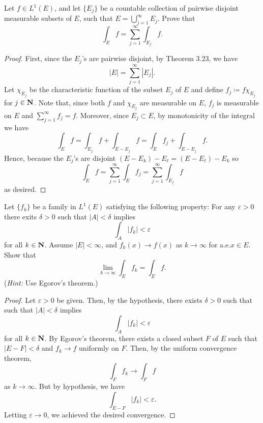 \begin{problem}
Let $f\in L^1(E)$, and let $\{E_j\}$ be a countable collection of pairwise
disjoint measurable subsets of $E$, such that $E=\bigcup_{j=1}^\infty
E_j$. Prove that
\[
\int_E f=\sum_{j=1}^\infty\int_{E_j}f.
\]
\end{problem}
\begin{proof}
First, since the $E_j$'s are pairwise disjoint, by Theorem 3.23, we have
\begin{equation}
\label{eq:disjoint-measure-2-2}
|E|=\sum_{j=1}^\infty|E_j|.
\end{equation}
Let $\chi_{E_j}$ be the characteristic function of the subset $E_j$ of
$E$ and define $f_j\coloneqq f\chi_{E_j}$ for $j\in\mathbf{N}$. Note that, since
both $f$ and $\chi_{E_j}$ are measurable on $E$, $f_j$ is
measurable on $E$ and $\sum_{j=1}^\infty f_j=f$. Moreover, since
$E_j\subset E$, by monotonicity of the integral we have
\begin{equation}
\label{eq:monotonicity-2-2}
\int_{E} f=
\int_{E_j} f+\int_{E\minus E_j}f=
\int_E f_j+\int_{E\minus E_j}f.
\end{equation}
Hence, because the $E_j$'s are disjoint $(E\minus E_k)\minus
E_\ell=(E\minus E_\ell)\minus E_k$ so
\begin{equation}
\label{eq:desired-sum-2}
\int_E f=\sum_{j=1}^\infty\int_E f_j=\sum_{j=1}^\infty\int_{E_j}f
\end{equation}
as desired.
\end{proof}

\begin{problem}
Let $\{f_k\}$ be a family in $L^1(E)$ satisfying the following property:
For any $\varepsilon>0$ there exits $\delta>0$ such that $|A|<\delta$
implies
\[
\int_A |f_k|<\varepsilon
\]
for all $k\in\mathbf{N}$. Assume $|E|<\infty$, and $f_k(x)\to f(x)$ as
$k\to\infty$ for a.e.\@ $x\in E$. Show that
\[
\lim_{k\to\infty}\int_E f_k=\int_E f.
\]
(\emph{Hint:} Use Egorov's theorem.)
\end{problem}
\begin{proof}
Let $\varepsilon>0$ be given. Then, by the hypothesis, there exists
$\delta>0$ such that
such that $|A|<\delta$
implies
\begin{equation}
  \label{eq:hypothesis-2-3}
\int_A |f_k|<\varepsilon
\end{equation}
for all $k\in\mathbf{N}$. By Egorov's theorem, there exists a closed subset $F$
of $E$ such that $|E\minus F|<\delta$ and $f_k\to f$ uniformly on
$F$. Then, by the uniform convergence theorem,
\begin{equation}
\label{eq:uniform-convergence-2-3}
\int_F f_k\longrightarrow \int_F f
\end{equation}
as $k\to\infty$. But by hypothesis, we have
\begin{equation}
\label{eq:need-to-show-2-}
\int_{E\minus F} |f_k|<\varepsilon.
\end{equation}
Letting $\varepsilon\to 0$, we achieved the desired convergence.
\end{proof}

